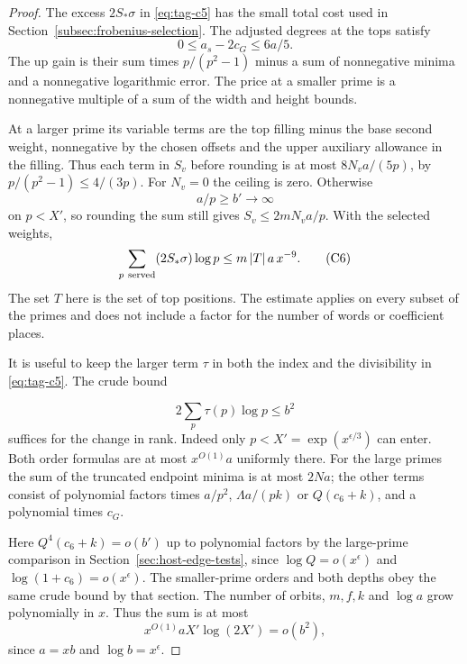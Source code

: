 \begin{proof}

The excess \(2S_*\sigma\) in \eqref{eq:tag-c5} has the small total cost used
in Section~\ref{subsec:frobenius-selection}. The adjusted degrees at the tops satisfy
\[
  0\le a_s-2c_G\le6a/5.
\]
 The up gain is their
sum times \(p/(p^2-1)\) minus a sum of nonnegative minima and a
nonnegative logarithmic error. The price at a smaller prime is a
nonnegative multiple of a sum of the width and height bounds.

At
a larger prime its variable terms are the top filling minus the
base second weight, nonnegative by the chosen offsets and the
upper auxiliary allowance in the filling. Thus each term in \(S_v\)
before rounding is at most \(8N_va/(5p)\), by
\(p/(p^2-1)\le4/(3p)\). For \(N_v=0\) the ceiling is zero.
Otherwise 
\[
  a/p\ge b'\to\infty
\]
 on \(p<X'\), so rounding the
sum still gives \(S_v\le2mN_va/p\). With the selected weights,
\[
    \sum_{p\ {\rm served}}(2 S_*\sigma)\log p
             \le m\,|T|\,a\, x^{-9}.
                                                               \tag{C6}\label{eq:tag-c6}
\]
The set \(T\) here is the set of top positions. The estimate applies
on every subset of the primes and does not include a factor for the
number of words or coefficient places.


It is useful to keep the larger term \(\tau\) in both the index
and the divisibility in \eqref{eq:tag-c5}. The crude bound

\[
  2\sum_p\tau(p)\log p\le b^2
\]
 suffices for the change in rank.
Indeed only \(p<X'=\exp(x^{\epsilon/3})\) can enter. Both order
formulas are at most \(x^{O(1)}a\) uniformly there. For the large
primes the sum of the truncated endpoint minima is at most \(2Na\);
the other terms consist of polynomial factors times \(a/p^2\),
\(\Lambda a/(pk)\) or \(Q(c_6+k)\), and a polynomial times \(c_G\).

Here \(Q^4(c_6+k)=o(b')\) up to polynomial factors by the
large-prime comparison in Section~\ref{sec:host-edge-tests},
since \(\log Q=o(x^\epsilon)\) and
\(\log(1+c_6)=o(x^\epsilon)\). The smaller-prime orders and both
depths obey the same crude bound by that section. The number of
orbits, \(m,f,k\) and \(\log a\) grow polynomially in \(x\). Thus
the sum is at most 
\[
  x^{O(1)}a X'\log(2X')=o(b^2),
\]
 since
\(a=xb\) and \(\log b=x^\epsilon\).

\end{proof}


